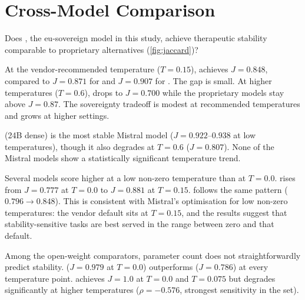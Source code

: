 \section{Cross-Model Comparison}
\label{sec:disc-models}

Does , the \gls{eu}-sovereign model in this
study, achieve therapeutic stability comparable to proprietary
alternatives (\autoref{fig:jaccard})?

At the vendor-recommended temperature ($T = 0.15$),
 achieves $J = 0.848$, compared to $J = 0.871$
for  and $J = 0.907$ for . The
gap is small. At higher temperatures ($T = 0.6$),
 drops to $J = 0.700$ while the proprietary
models stay above $J = 0.87$. The sovereignty tradeoff is modest at
recommended temperatures and grows at higher settings.

 (24B dense) is the most stable Mistral
model ($J = 0.922$--$0.938$ at low temperatures), though it also degrades
at $T = 0.6$ ($J = 0.807$). None of the Mistral models show a
statistically significant temperature trend.

Several models score higher at a low non-zero temperature than at
$T = 0.0$.  rises from $J = 0.777$ at
$T = 0.0$ to $J = 0.881$ at $T = 0.15$. 
follows the same pattern ($0.796 \to 0.848$). This is consistent with
Mistral's optimisation for low non-zero temperatures: the vendor default
sits at $T = 0.15$, and the results suggest that stability-sensitive
tasks are best served in the range between zero and that default.

Among the open-weight comparators, parameter count does not
straightforwardly predict stability. 
($J = 0.979$ at $T = 0.0$) outperforms 
($J = 0.786$) at every temperature point.
 achieves $J = 1.0$ at $T = 0.0$ and $T = 0.075$
but degrades significantly at higher temperatures ($\rho = -0.576$,
strongest sensitivity in the set).

